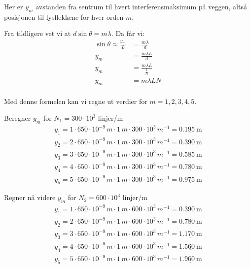 \documentclass{article}
\begin{document}
Her er $y_m$ avstanden fra sentrum til hvert interferensmaksimum på veggen, altså posisjonen til lysflekkene for hver orden $m$. 

\vspace{0.1in}
Fra tildligere vet vi at $d \sin{\theta} = m \lambda$. Da får vi:
\begin{align*}
    \sin{\theta} \approx \frac{y_m}{L} &= \frac{m \lambda}{d} \\
    y_m &= \frac{m \lambda L}{d} \\
    y_m &= \frac{m \lambda L}{\frac{1}{N}} \\
    y_m &= m \lambda L N \label{eq:33}\\
\end{align*}

\vspace{2in}

Med denne formelen kan vi regne ut verdier for $m = 1,2,3,4,5$. 

Beregner $y_m$ for $N_1 = 300 \cdot 10^3$ linjer/m
\begin{align*}
    y_1 = 1 \cdot 650 \cdot 10^{-9}\, m \cdot 1 \, m \cdot 300 \cdot 10^3 \, m^{-1} = \underline{\SI{0.195}{\meter}}\\
    y_2 = 2 \cdot 650 \cdot 10^{-9} \, m \cdot 1 \, m \cdot 300 \cdot 10^3 \, m^{-1} = \underline{\SI{0.390}{\meter}}\\
    y_3 = 3 \cdot 650 \cdot 10^{-9} \, m \cdot 1 \, m \cdot 300 \cdot 10^3 \, m^{-1} = \underline{\SI{0.585}{\meter}}\\
    y_4 = 4 \cdot 650 \cdot 10^{-9} \, m \cdot 1 \, m \cdot 300 \cdot 10^3 \, m^{-1} = \underline{\SI{0.780}{\meter}}\\
    y_5 = 5 \cdot 650 \cdot 10^{-9} \, m \cdot 1 \, m \cdot 300 \cdot 10^3 \, m^{-1} = \underline{\SI{0.975}{\meter} }
\end{align*}

\vspace{0.2in}

Regner nå videre $y_m$ for $N_2 = 600 \cdot 10^3$ linjer/m
\begin{align*}
    y_1 = 1 \cdot 650 \cdot 10^{-9} \, m \cdot 1 \, m \cdot 600 \cdot 10^3 \, m^{-1} = \underline{\SI{0.390}{\meter}}\\
    y_2 = 2 \cdot 650 \cdot 10^{-9} \, m \cdot 1 \, m \cdot 600 \cdot 10^3 \, m^{-1} = \underline{\SI{0.780}{\meter}}\\
    y_3 = 3 \cdot 650 \cdot 10^{-9} \, m \cdot 1 \, m \cdot 600 \cdot 10^3 \, m^{-1} = \underline{\SI{1.170}{\meter}}\\
    y_4 = 4 \cdot 650 \cdot 10^{-9} \, m \cdot 1 \, m \cdot 600 \cdot 10^3 \, m^{-1} = \underline{\SI{1.560}{\meter}}\\
    y_5 = 5 \cdot 650 \cdot 10^{-9} \, m \cdot 1 \, m \cdot 600 \cdot 10^3 \, m^{-1} = \underline{\SI{1.960}{\meter} }
\end{align*}
\end{document}
